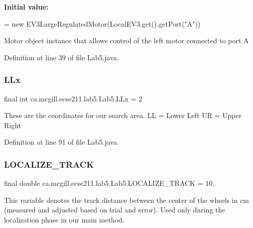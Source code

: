 {\bfseries Initial value\+:}
\begin{DoxyCode}
=
      \textcolor{keyword}{new} EV3LargeRegulatedMotor(LocalEV3.get().getPort(\textcolor{stringliteral}{"A"}))
\end{DoxyCode}
Motor object instance that allows control of the left motor connected to port A 

Definition at line 39 of file Lab5.\+java.

\mbox{\label{classca_1_1mcgill_1_1ecse211_1_1lab5_1_1_lab5_a957a526ed669e9d8b7fc485e21385ee9}} 
\subsubsection{\texorpdfstring{L\+Lx}{LLx}}
{\footnotesize\ttfamily final int ca.\+mcgill.\+ecse211.\+lab5.\+Lab5.\+L\+Lx = 2\hspace{0.3cm}{\ttfamily [static]}}

These are the coordinates for our search area. LL = Lower Left UR = Upper Right 

Definition at line 91 of file Lab5.\+java.

\mbox{\label{classca_1_1mcgill_1_1ecse211_1_1lab5_1_1_lab5_a971cb3d8a46c2b41bcadf08f21498d6d}} 
\subsubsection{\texorpdfstring{L\+O\+C\+A\+L\+I\+Z\+E\+\_\+\+T\+R\+A\+CK}{LOCALIZE\_TRACK}}
{\footnotesize\ttfamily final double ca.\+mcgill.\+ecse211.\+lab5.\+Lab5.\+L\+O\+C\+A\+L\+I\+Z\+E\+\_\+\+T\+R\+A\+CK = 10.\hspace{0.3cm}{\ttfamily [static]}}

This variable denotes the track distance between the center of the wheels in cm (measured and adjusted based on trial and error). Used only during the localization phase in our main method. 


